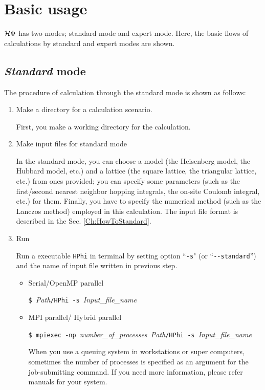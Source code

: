 \section{Basic usage}
$\mathcal{H} \Phi$ has two modes; standard mode and expert mode. Here, the basic flows of calculations by standard and expert modes are shown.

\subsection{{\it Standard} mode}

The procedure of calculation through the standard mode is shown as follows:

\begin{enumerate}

\item  Make a directory for a calculation scenario. 

First, you make a working directory for the calculation.

\item  Make input files for standard mode

In the standard mode, you can choose a model (the Heisenberg model, the Hubbard model, etc.) and 
a lattice (the square lattice, the triangular lattice, etc.) from ones provided;
you can specify some parameters (such as the first/second nearest neighbor hopping integrals,
the on-site Coulomb integral, etc.) for them.
Finally, you have to specify the numerical method (such as the Lanczos method) employed in this calculation.
The input file format is described in the Sec. \ref{Ch:HowToStandard}.

\item  Run

Run a executable \verb|HPhi| in terminal by setting option ``\verb|-s|" (or ``\verb|--standard|'') and the name of input file written in previous step.

\begin{itemize}

\item Serial/OpenMP parallel

  \verb|$ |\textit{Path}\verb|/HPhi -s |\textit{Input\_file\_name}

\item MPI parallel/ Hybrid parallel

  \verb|$ mpiexec -np |\textit{number\_of\_processes}\verb| |\textit{Path}\verb|/HPhi -s |\textit{Input\_file\_name}

  When you use a queuing system in workstations or super computers, 
  sometimes the number of processes is specified as an argument for the job-submitting command.
  If you need more information, please refer manuals for your system.


\end{itemize}
\end{enumerate}
